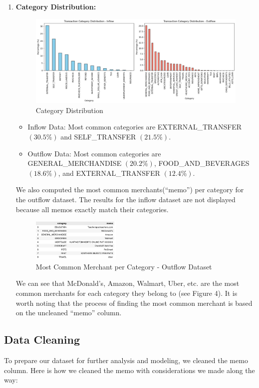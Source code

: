 \documentclass[12pt,letterpaper]{article}
\begin{document}
\begin{enumerate}
    \item{\textbf{Category Distribution:}}
    \begin{figure}[H]
        \centering
        \includegraphics[width=1.0\textwidth]{figure/category_dist.png}
        \caption{Category Distribution}
        \label{fig:enter-label}
    \end{figure}
    \begin{itemize}
        \item Inflow Data: Most common categories are EXTERNAL\_TRANSFER $(30.5\%)$ and SELF\_TRANSFER $(21.5\%)$.
        \item Outflow Data: Most common categories are GENERAL\_MERCHANDISE $(20.2\%)$, FOOD\_AND\_BEVERAGES $(18.6\%)$, and EXTERNAL\_TRANSFER $(12.4\%)$.
    \end{itemize}

    {We also computed the most common merchants(“memo”) per category for the outflow dataset. The results for the inflow dataset are not displayed because all memos exactly match their categories.}
    \begin{figure}[H]
        \centering
        \includegraphics[width=0.4\textwidth]{figure/cmn_merchant.png}
        \caption{Most Common Merchant per Category - Outflow Dataset}
        \label{fig:enter-label}
    \end{figure}
    {We can see that McDonald’s, Amazon, Walmart, Uber, etc. are the most common merchants for each category they belong to (see Figure 4). It is worth noting that the process of finding the most common merchant is based on the uncleaned “memo” column.}
\end{enumerate}

\subsection{Data Cleaning}
{To prepare our dataset for further analysis and modeling, we cleaned the memo column.}
{Here is how we cleaned the memo with considerations we made along the way:}
\end{document}

